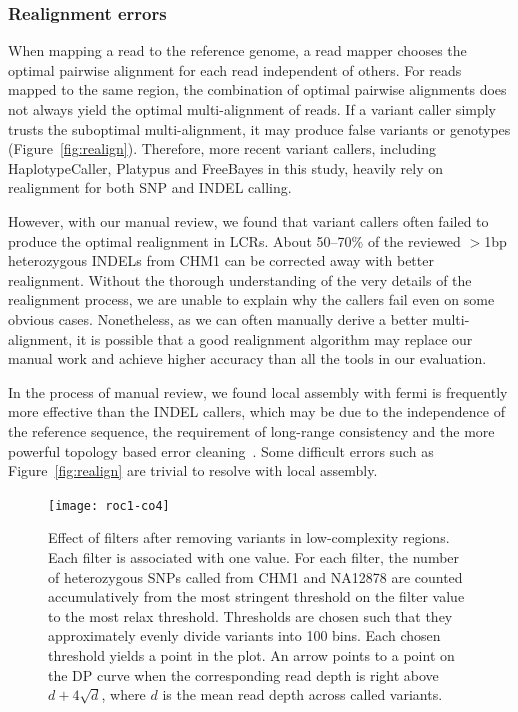 \documentclass{bioinfo-ori}
\begin{document}
\subsubsection{Realignment errors}
When mapping a read to the reference genome, a read mapper chooses the optimal
pairwise alignment for each read independent of others. For reads mapped to the
same region, the combination of optimal pairwise alignments does not always
yield the optimal multi-alignment of reads. If a variant caller simply trusts
the suboptimal multi-alignment, it may produce false variants or genotypes
(Figure~\ref{fig:realign}). Therefore, more recent variant callers, including
HaplotypeCaller, Platypus and FreeBayes in this study, heavily rely on
realignment for both SNP and INDEL calling.

However, with our manual review, we found that variant callers often failed to
produce the optimal realignment in LCRs. About 50--70\% of the reviewed
$>$1bp heterozygous INDELs from CHM1 can be corrected away with better
realignment. Without the thorough understanding of the very details of the
realignment process, we are unable to explain why the callers fail even on some
obvious cases. Nonetheless, as we can often manually derive a better
multi-alignment, it is possible that a good realignment algorithm may replace
our manual work and achieve higher accuracy than all the tools in our
evaluation.

In the process of manual review, we found local assembly with fermi is
frequently more effective than the INDEL callers, which may be due to the
independence of the reference sequence, the requirement of long-range
consistency and the more powerful topology based error
cleaning~\citep{Zerbino:2008uq}. Some difficult errors such as
Figure~\ref{fig:realign} are trivial to resolve with local assembly.

\begin{figure}
\texttt{[image: roc1-co4]}
\caption{Effect of filters after removing variants in low-complexity regions.
Each filter is associated with one value.  For each filter, the number of
heterozygous SNPs called from CHM1 and NA12878 are counted accumulatively from
the most stringent threshold on the filter value to the most relax threshold.
Thresholds are chosen such that they approximately evenly divide variants into
100 bins. Each chosen threshold yields a point in the plot. An arrow points
to a point on the DP curve when the corresponding read depth is right above
$d+4\sqrt{d}$, where $d$ is the mean read depth across called variants.}\label{fig:roc} \end{figure}
\end{document}
